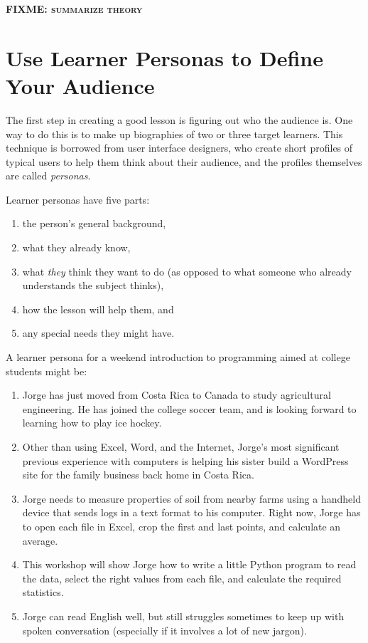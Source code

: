 \documentclass[10pt,letterpaper]{article}
\newcommand{\fixme}[1]{\textsc{\textbf{FIXME: {#1}}}}
\newcommand{\rulemajor}[1]{\section{#1}}
\begin{document}
\fixme{summarize theory}

\rulemajor{Use Learner Personas to Define Your Audience}

The first step in creating a good lesson is figuring out who the audience is.
One way to do this is to make up biographies of two or three target learners.
This technique is borrowed from user interface designers, who create short
profiles of typical users to help them think about their audience, and the
profiles themselves are called \emph{personas}.

Learner personas have five parts:

\begin{enumerate}

\item the person's general background,

\item what they already know,

\item what \emph{they} think they want to do (as opposed to what someone who
  already understands the subject thinks),

\item how the lesson will help them, and

\item any special needs they might have.

\end{enumerate}

A learner persona for a weekend introduction to programming aimed at college
students might be:

\begin{enumerate}

\item Jorge has just moved from Costa Rica to Canada to study agricultural
  engineering. He has joined the college soccer team, and is looking forward to
  learning how to play ice hockey.

\item Other than using Excel, Word, and the Internet, Jorge's most significant
  previous experience with computers is helping his sister build a WordPress
  site for the family business back home in Costa Rica.

\item Jorge needs to measure properties of soil from nearby farms using a
  handheld device that sends logs in a text format to his computer.  Right now,
  Jorge has to open each file in Excel, crop the first and last points, and
  calculate an average.

\item This workshop will show Jorge how to write a little Python program to read
  the data, select the right values from each file, and calculate the required
  statistics.

\item Jorge can read English well, but still struggles sometimes to keep up with
  spoken conversation (especially if it involves a lot of new jargon).

\end{enumerate}
\end{document}
